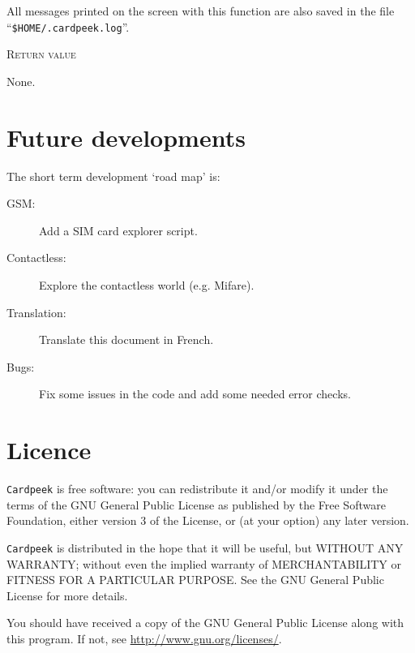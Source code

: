 \documentclass[11pt]{report}
\newcommand{\mansection}[1]{\vspace{0.5em}\par\noindent\textsc{#1}\vspace{0.5em}\par}
\newcommand{\syn}[1]{\texttt{#1}}
\begin{document}
  All messages printed on the screen with this function are also 
  saved in the file ``\syn{\$HOME/.cardpeek.log}''.
\mansection{Return value}
  None.


\chapter{Future developments}

The short term development `road map' is:
\begin{description}
\item[GSM:]{Add a SIM card explorer script.}
\item[Contactless:]{Explore the contactless world (e.g. Mifare).}
\item[Translation:]{Translate this document in French.}
\item[Bugs:]{Fix some issues in the code and add some needed error checks.}
\end{description}

\chapter{Licence}
\label{chapter:licence}

\texttt{Cardpeek} is free software: you can redistribute it and/or modify
it under the terms of the GNU General Public License as published by
the Free Software Foundation, either version 3 of the License, or
(at your option) any later version.

\texttt{Cardpeek} is distributed in the hope that it will be useful,
but WITHOUT ANY WARRANTY; without even the implied warranty of
MERCHANTABILITY or FITNESS FOR A PARTICULAR PURPOSE.  See the
GNU General Public License for more details.

You should have received a copy of the GNU General Public License
along with this program.  If not, see \url{http://www.gnu.org/licenses/}.
\end{document}

